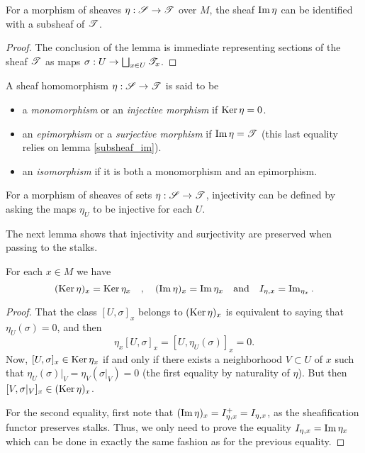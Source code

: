 \begin{lemma}\label{subsheaf_im}
For a morphism of sheaves $\eta :\mathscr{S}\to \mathscr{T}$ over $M$, the sheaf $\operatorname{Im}\eta$ can be identified with a subsheaf of $\mathscr{T}$.
\end{lemma}
\begin{proof}
The conclusion of the lemma is immediate representing sections of the sheaf $\mathscr{T}$ as maps $\sigma :U\to \bigsqcup_{x\in U}\mathscr{T}_x$.
\end{proof}

\begin{defi}
A sheaf homomorphism $\eta :\mathscr{S}\to \mathscr{T}$ is said to be
\begin{itemize}
\item a \emph{monomorphism} or an \emph{injective morphism} if $\operatorname{Ker}\eta=0$.
\item an \emph{epimorphism} or a \emph{surjective morphism} if $\operatorname{Im}\eta=\mathscr{T}$ (this last equality relies on lemma \ref{subsheaf_im}).
\item an \emph{isomorphism} if it is both a monomorphism and an epimorphism.
\end{itemize}
\end{defi}

\begin{obs}
For a morphism of sheaves of sets $\eta :\mathscr{S}\to \mathscr{T}$, injectivity can be defined by asking the maps $\eta_U$ to be injective for each $U$.
\end{obs}

The next lemma shows that injectivity and surjectivity are preserved when passing to the stalks.

\begin{lemma}\label{stalks_ker_im}
For each $x\in M$ we have
$$(\operatorname{Ker}\eta )_x=\operatorname{Ker}\eta_x \quad , \quad (\operatorname{Im}\eta )_x=\operatorname{Im}\eta_x \quad \text{and} \quad I_{\eta ,x}=\operatorname{Im}_{\eta_x}.$$
\end{lemma}
\begin{proof}
That the class $[U,\sigma ]_x$ belongs to $(\operatorname{Ker}\eta )_x$ is equivalent to saying that $\eta_U(\sigma )=0$, and then
$$\eta_x[U,\sigma]_x=[U,\eta_U(\sigma )]_x=0.$$
Now, $[U,\sigma ]_x\in \operatorname{Ker}\eta_x$ if and only if there exists a neighborhood $V\subset U$ of $x$ such that $\eta_U(\sigma )|_V=\eta_V(\sigma|_V)=0$ (the first equality by naturality of $\eta$). But then $[V,\sigma|_V]_x\in (\operatorname{Ker}\eta)_x$.

For the second equality, first note that $(\operatorname{Im}\eta)_x=I^+_{\eta ,x}=I_{\eta ,x}$, as the sheafification functor preserves stalks. Thus, we only need to prove the equality $I_{\eta ,x}=\operatorname{Im}\eta_x$ which can be done in exactly the same fashion as for the previous equality.
\end{proof}

